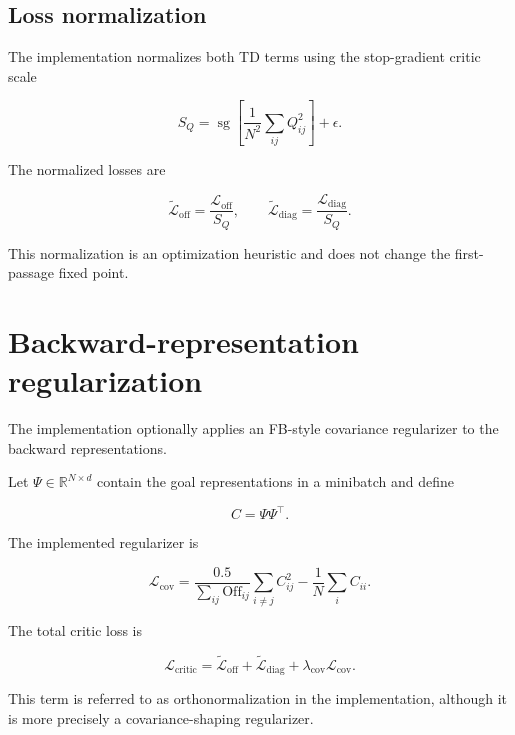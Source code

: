 \documentclass[11pt]{article}
\newcommand{\R}{\mathbb{R}}
\newcommand{\sg}{\operatorname{sg}}
\theoremstyle{remark}
\begin{document}
\subsection{Loss normalization}

The implementation normalizes both TD terms using the stop-gradient critic scale

\begin{equation}
S_Q=\sg\left[\frac{1}{N^2}\sum_{ij}Q_{ij}^2\right]+\epsilon.
\label{eq:q-scale}
\end{equation}

The normalized losses are

\begin{equation}
\widetilde{\mathcal L}_{\mathrm{off}}=\frac{\mathcal L_{\mathrm{off}}}{S_Q},
\qquad
\widetilde{\mathcal L}_{\mathrm{diag}}=\frac{\mathcal L_{\mathrm{diag}}}{S_Q}.
\label{eq:normalized-losses}
\end{equation}

This normalization is an optimization heuristic and does not change the first-passage fixed point.

\section{Backward-representation regularization}

The implementation optionally applies an FB-style covariance regularizer to the backward representations.

Let $\Psi\in\R^{N\times d}$ contain the goal representations in a minibatch and define

\begin{equation}
C=\Psi\Psi^\top.
\end{equation}

The implemented regularizer is

\begin{equation}
\mathcal L_{\mathrm{cov}}=\frac{0.5}{\sum_{ij}\mathrm{Off}_{ij}}\sum_{i\neq j}C_{ij}^2-\frac{1}{N}\sum_i C_{ii}.
\label{eq:cov-loss}
\end{equation}

The total critic loss is

\begin{equation}
\mathcal L_{\mathrm{critic}}=\widetilde{\mathcal L}_{\mathrm{off}}+\widetilde{\mathcal L}_{\mathrm{diag}}+\lambda_{\mathrm{cov}}\mathcal L_{\mathrm{cov}}.
\label{eq:critic-loss}
\end{equation}

This term is referred to as orthonormalization in the implementation, although it is more precisely a covariance-shaping regularizer.
\end{document}
